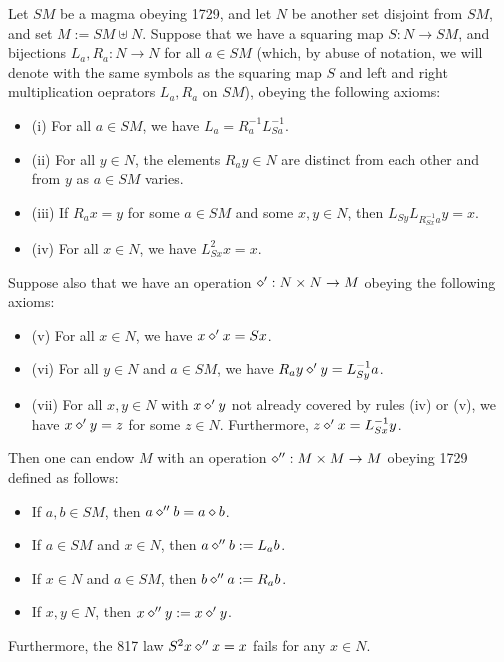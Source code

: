 \begin{theorem}\label{mag}  Let $SM$ be a magma obeying 1729, and let $N$ be another set disjoint from $SM$, and set $M := SM \uplus N$.  Suppose that we have a squaring map $S: N \to SM$, and bijections $L_a, R_a: N \to N$ for all $a \in SM$ (which, by abuse of notation, we will denote with the same symbols as the squaring map $S$ and left and right multiplication oeprators $L_a,R_a$ on $SM$), obeying the following axioms:
  \begin{itemize}
  \item (i) For all $a \in SM$, we have $L_a = R_a^{-1} L_{Sa}^{-1}$.
  \item (ii) For all $y \in N$, the elements $R_a y \in N$ are distinct from each other and from $y$ as $a \in SM$ varies.
  \item (iii)  If $R_a x = y$ for some $a \in SM$ and some $x,y \in N$, then $L_{Sy} L_{R_{Sx}^{-1} a} y = x$.
  \item (iv)  For all $x \in N$, we have $L_{Sx}^2 x = x$.
  \end{itemize}
Suppose also that we have an operation $\diamond': N \times N \to M$ obeying the following axioms:
\begin{itemize}
  \item (v)  For all $x \in N$, we have $x \diamond' x = Sx$.
  \item (vi)  For all $y \in N$ and $a \in SM$, we have $R_a y \diamond' y = L_{Sy}^{-1} a$.
  \item (vii)  For all $x,y \in N$ with $x \diamond' y$ not already covered by rules (iv) or (v), we have $x \diamond' y = z$ for some $z \in N$.  Furthermore, $z \diamond' x = L_{Sx}^{-1} y$.
\end{itemize}
Then one can endow $M$ with an operation $\diamond'': M \times M \to M$ obeying 1729 defined as follows:
\begin{itemize}
\item  If $a,b \in SM$, then $a \diamond'' b = a \diamond b$.
\item  If $a \in SM$ and $x \in N$, then $a \diamond'' b := L_a b$.
\item  If $x \in N$ and $a \in SM$, then $b \diamond'' a := R_a b$.
\item  If $x,y \in N$, then $x \diamond'' y := x \diamond' y$.
\end{itemize}
Furthermore, the 817 law $S^2 x \diamond'' x = x$ fails for any $x \in N$.
\end{theorem}

